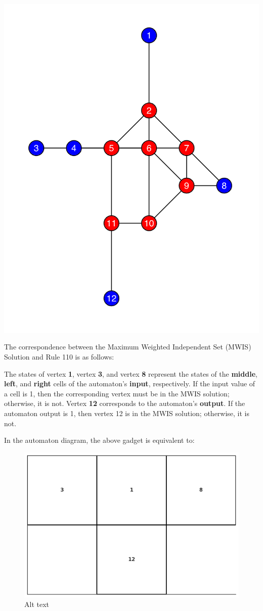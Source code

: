 \documentclass[twocolumn,superscriptaddress,english,showpacs,longbibliography]{revtex4-2}
\begin{document}
\includegraphics[width=0.7\columnwidth]{../notes/images/image-1.png}

The correspondence between the Maximum Weighted Independent Set (MWIS)
Solution and Rule 110 is as follows:

The states of vertex \textbf{1}, vertex \textbf{3}, and vertex
\textbf{8} represent the states of the \textbf{middle}, \textbf{left},
and \textbf{right} cells of the automaton's \textbf{input},
respectively. If the input value of a cell is 1, then the corresponding
vertex must be in the MWIS solution; otherwise, it is not. Vertex
\textbf{12} corresponds to the automaton's \textbf{output}. If the
automaton output is 1, then vertex 12 is in the MWIS solution;
otherwise, it is not.

In the automaton diagram, the above gadget is equivalent to:

\begin{figure}
\centering
\includegraphics[width=\columnwidth]{../notes/images/rule110.png}
\caption{Alt text}
\end{figure}
\end{document}
